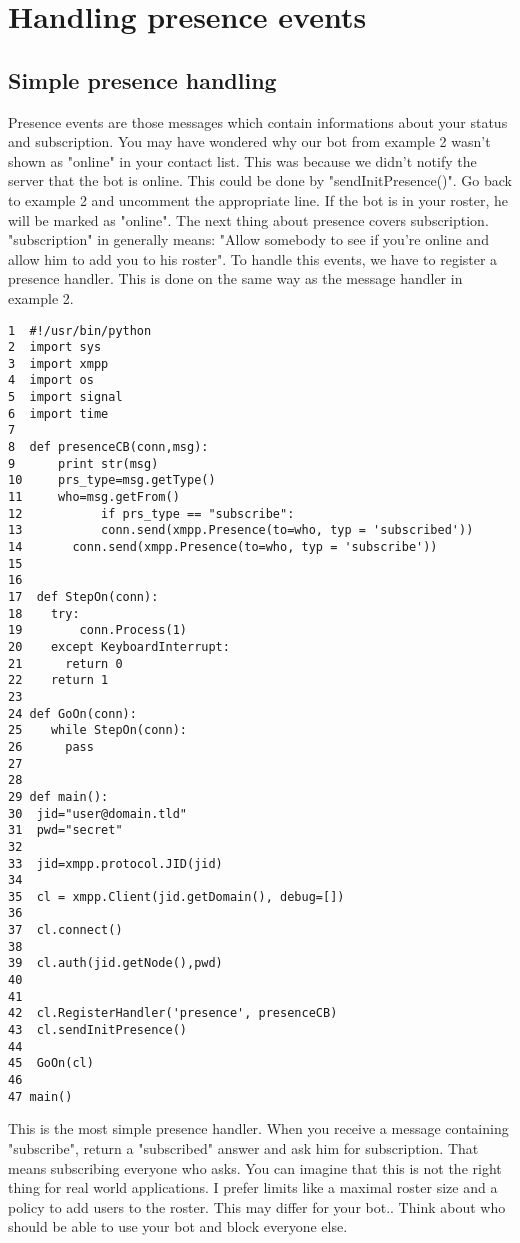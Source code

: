 \section{Handling presence events}

\subsection{Simple presence handling}

Presence events are those messages which contain informations about your status and subscription.
You may have wondered why our bot from example 2 wasn't shown as "online" in your contact list.
This was because we didn't notify the server that the bot is online. This could be done by "sendInitPresence()". Go back to example 2 and uncomment the appropriate line. If the bot is in your roster, he will be marked as "online".
\newline
\newline
The next thing about presence covers subscription. "subscription" in generally means: "Allow somebody to see if you're online and allow him to add you to his roster".
To handle this events, we have to register a presence handler. This is done on the same way as the message handler in example 2.

\begin{verbatim}
1  #!/usr/bin/python
2  import sys
3  import xmpp
4  import os
5  import signal
6  import time
7
8  def presenceCB(conn,msg):
9      print str(msg)
10     prs_type=msg.getType()
11     who=msg.getFrom()
12           if prs_type == "subscribe":
13           conn.send(xmpp.Presence(to=who, typ = 'subscribed'))
14	     conn.send(xmpp.Presence(to=who, typ = 'subscribe'))
15
16
17  def StepOn(conn):
18    try:
19        conn.Process(1)
20    except KeyboardInterrupt:
21	    return 0
22    return 1
23
24 def GoOn(conn):
25    while StepOn(conn):
26	    pass
27
28
29 def main():
30	jid="user@domain.tld"
31	pwd="secret"
32
33	jid=xmpp.protocol.JID(jid)
34
35	cl = xmpp.Client(jid.getDomain(), debug=[])
36
37	cl.connect()
38
39	cl.auth(jid.getNode(),pwd)
40
41
42	cl.RegisterHandler('presence', presenceCB)
43	cl.sendInitPresence()
44
45	GoOn(cl)
46
47 main()
\end{verbatim}
This is the most simple presence handler. When you receive a message containing "subscribe", return a "subscribed" answer and ask him for subscription. That means subscribing everyone who asks.
You can imagine that this is not the right thing for real world applications. I prefer limits like a maximal roster size and a policy to add users to the roster. This may differ for your bot..
\newline
Think about who should be able to use your bot and block everyone else.
\newpage

